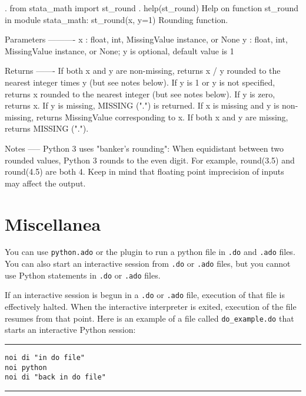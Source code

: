 \documentclass{article}
\begin{document}
\begin{stlog}
{\smallskip}
{\bftt{>>>}}. from stata_math import st_round
{\smallskip}
{\bftt{>>>}}. help(st_round)
Help on function st_round in module stata_math:
{\smallskip}
st_round(x, y=1)
    Rounding function.
    
    Parameters
    ----------
    x : float, int, MissingValue instance, or None
    y : float, int, MissingValue instance, or None;
        y is optional, default value is 1
    
    Returns
    -------
    If both x and y are non-missing, returns x / y rounded to
        the nearest integer times y (but see notes below).
    If y is 1 or y is not specified, returns x rounded to the 
        nearest integer (but see notes below).
    If y is zero, returns x.
    If y is missing, MISSING (".") is returned.
    If x is missing and y is non-missing, returns MissingValue
        corresponding to x.
    If both x and y are missing, returns MISSING (".").
    
    Notes
    -----
    Python 3 uses "banker's rounding": When equidistant between two rounded
    values, Python 3 rounds to the even digit. For example, round(3.5) and
    round(4.5) are both 4. Keep in mind that floating point imprecision of
    inputs may affect the output.
{\smallskip}
{\smallskip}
\end{stlog}



\section{Miscellanea} \label{misc}
		
You can use \lstinline$python.ado$ or the plugin to run a python file in \lstinline$.do$ and \lstinline$.ado$ files. You can also start an interactive session from \lstinline$.do$ or \lstinline{.ado} files, but you cannot use Python statements in \lstinline$.do$ or \lstinline$.ado$ files.
		
If an interactive session is begun in a \lstinline{.do} or \lstinline{.ado} file, execution of that file is effectively halted. When the interactive interpreter is exited, execution of the file resumes from that point. Here is an example of a file called \lstinline$do_example.do$ that starts an interactive Python session: \newline

\hrule
\begin{lstlisting}
noi di "in do file"
noi python
noi di "back in do file"
\end{lstlisting}
\hrule
\end{document}
